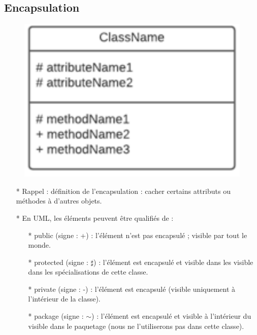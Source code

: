 \documentclass[12pt]{article}
\begin{document}
\subsection{Encapsulation}
\begin{figure}[!hbtp]
	\centering
	\includegraphics[scale=0.75]{Capture2.PNG}
\end{figure}
\begin{itemize}
	\item[* ] Rappel : définition de l'encapsulation : cacher
	certains attributs ou méthodes à d'autres objets.
	\item[* ] En UML, les éléments peuvent être qualifiés de :
	\begin{itemize}
		\item[* ] public (signe : +) : l'élément n'est pas encapsulé ; visible
		par tout le monde.
		\item[* ] protected (signe : $\sharp$) : l'élément est encapsulé et visible dans les
		visible dans les spécialisations de cette classe.
		\item[* ] private (signe : -) : l'élément est encapsulé (visible uniquement 
		 à l'intérieur de la classe).
		 \item[* ] package (signe : $\sim$) : l'élément est encapsulé et visible à l'intérieur du
		 visible dans le paquetage (nous ne l'utiliserons pas dans cette classe).
	\end{itemize}
\end{itemize}
\end{document}
